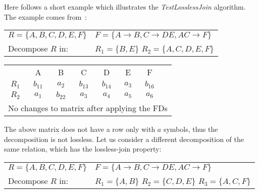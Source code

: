 Here follows a short example which illustrates the \textit{TestLosslessJoin} algorithm. 
The example comes from~\cite[Figure 11.1]{bdb1}:

\vspace{0.2cm}

\indent \begin{tabular}[h]{l l}
  $R = \{A, B, C, D, E, F\}$ & $F = \{A \rightarrow B, C \rightarrow DE, AC \rightarrow F\}$ \\
  Decompose $R$ in: & $R_1 = \{B, E\}$ $R_2 = \{A, C, D, E, F\}$\\
\end{tabular}

\vspace{0.2cm}

\footnotesize
\indent \begin{tabular}[h]{c|c|c|c|c|c|c|c}
  \cline{2-7}
  & A & B & C & D & E & F \\
  \cline{2-7}
  \cline{2-7}
  $R_1$ & $b_{11}$ & $a_2$ & $b_{13}$ & $b_{14}$ & $a_3$ & $b_{16}$ \\
  $R_2$ & $a_1$ & $b_{22}$ & $a_{3}$ & $a_4$ & $a_5$ & $a_6$ \\
  \cline{2-7}
  \multicolumn{8}{l}{No changes to matrix after applying the FDs}
\end{tabular}
\normalsize

\vspace{0.2cm}

The above matrix does not have a row only with $a$ symbols, thus the decomposition is 
not lossless. Let us consider a different decomposition of the same relation, which has
the lossless-join property:

\vspace{0.2cm}

\begin{tabular}[h]{l l}
  $R = \{A, B, C, D, E, F\}$ & $F = \{A \rightarrow B, C \rightarrow DE, AC \rightarrow F\}$ \\
  Decompose $R$ in: & $R_1 = \{A, B\}$ $R_2 = \{C, D, E\}$ $R_3 = \{A, C, F\}$\\
\end{tabular} 

\vspace{0.2cm}

